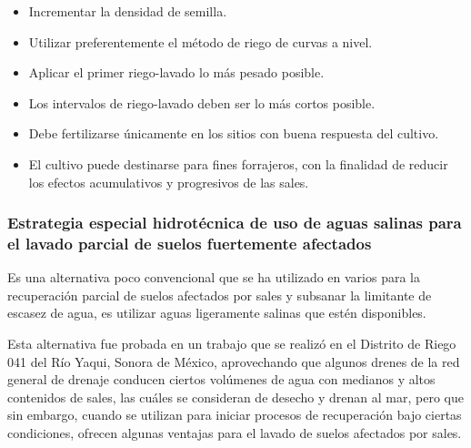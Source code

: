 \begin{itemize}
    \item Incrementar la densidad de semilla.
    \item Utilizar preferentemente el método de riego de curvas a nivel.
    \item Aplicar el primer riego-lavado lo más pesado posible.
    \item Los intervalos de riego-lavado deben ser lo más cortos posible.
    \item Debe fertilizarse únicamente en los sitios con buena respuesta del cultivo.
    \item El cultivo puede destinarse para fines forrajeros, con la finalidad de reducir los efectos acumulativos y progresivos de las sales.
\end{itemize}
\subsubsection{Estrategia especial hidrotécnica de uso de aguas salinas para el lavado parcial de suelos fuertemente afectados}
Es una alternativa poco convencional que se ha utilizado en varios para la recuperación parcial de suelos afectados por sales y subsanar la limitante de escasez de agua, es utilizar aguas ligeramente salinas que estén disponibles.

Esta alternativa fue probada en un trabajo que se realizó en el Distrito de Riego 041 del Río Yaqui, Sonora de México, aprovechando que algunos drenes de la red general de drenaje conducen ciertos volúmenes de agua con medianos y altos contenidos de sales, las cuáles se consideran de desecho y drenan al mar, pero que sin embargo, cuando se utilizan para iniciar procesos de recuperación bajo ciertas condiciones, ofrecen algunas ventajas para el lavado de suelos afectados por sales.

